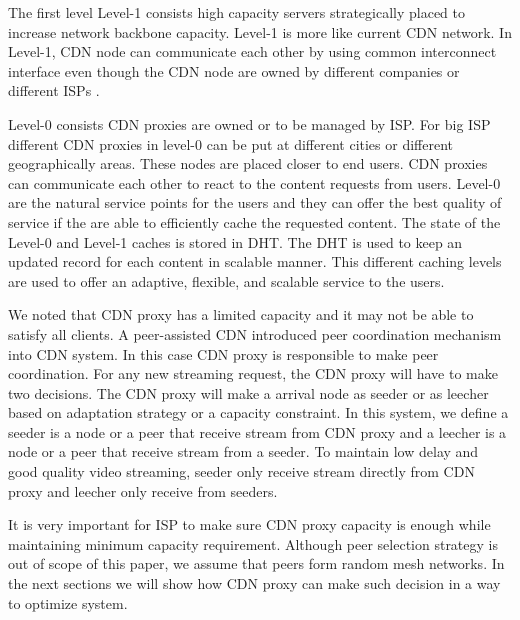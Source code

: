 \documentclass[paper]{ieice}
\begin{document}
The first level Level-1 consists high capacity servers strategically placed to increase network backbone capacity.
Level-1 is more like current CDN network.
In Level-1, CDN node can communicate each other by using common interconnect interface even though the CDN node are owned by different companies or different ISPs \cite{cdni}.

Level-0 consists CDN proxies are owned or to be managed by ISP.
For big ISP different CDN proxies in level-0 can be put at different cities or different geographically areas.
These nodes are placed closer to end users. 
CDN proxies can communicate each other to react to the content requests from users.
Level-0 are the natural service points for the users and they can offer the best quality of service if the are able to efficiently cache the requested content.
The state of the Level-0 and Level-1 caches is stored in DHT. 
The DHT is used to keep an updated record for each content in scalable manner. 
This different caching levels are used to offer an adaptive, flexible, and scalable service to the users.

We noted that CDN proxy has a limited capacity and it may not be able to satisfy all clients.
A peer-assisted CDN introduced peer coordination mechanism into CDN system. 
In this case CDN proxy is responsible to make peer coordination.  
For any new streaming request, the CDN proxy will have to make two decisions.
The CDN proxy will make a arrival node as seeder or as leecher based on adaptation strategy or a capacity constraint.  
In this system, we define a seeder is a node or a peer that receive stream from CDN proxy and a leecher is a node or a peer that receive stream from a seeder.  
To maintain low delay and good quality video streaming, seeder only receive stream directly from CDN proxy and leecher only receive from seeders.

It is very important for ISP to make sure CDN proxy capacity is enough while maintaining minimum capacity requirement. 
Although peer selection strategy is out of scope of this paper, we assume that peers form random mesh networks. 
In the next sections we will show how CDN proxy can make such decision in a way to optimize system.

 
\end{document}
